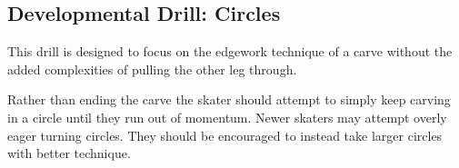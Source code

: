 \subsection*{Developmental Drill: Circles}

This drill is designed to focus on the edgework technique of a carve without the added complexities of pulling the other leg through.

Rather than ending the carve the skater should attempt to simply keep carving in a circle until they run out of momentum. 
Newer skaters may attempt overly eager turning circles.  
They should be encouraged to instead take larger circles with better technique. 

